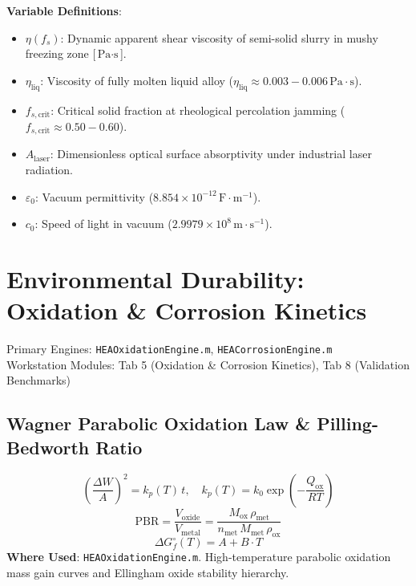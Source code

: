 \documentclass[11pt,a4paper]{article}
\begin{document}
\noindent\textbf{Variable Definitions}:
\begin{itemize}
  \item $\eta(f_s)$: Dynamic apparent shear viscosity of semi-solid slurry in mushy freezing zone [$\text{Pa}\cdot\text{s}$].
  \item $\eta_{\text{liq}}$: Viscosity of fully molten liquid alloy ($\eta_{\text{liq}} \approx 0.003 - 0.006 \, \text{Pa}\cdot\text{s}$).
  \item $f_{s, \text{crit}}$: Critical solid fraction at rheological percolation jamming ($f_{s, \text{crit}} \approx 0.50 - 0.60$).
  \item $A_{\text{laser}}$: Dimensionless optical surface absorptivity under industrial laser radiation.
  \item $\varepsilon_0$: Vacuum permittivity ($8.854 \times 10^{-12} \, \text{F}\cdot\text{m}^{-1}$).
  \item $c_0$: Speed of light in vacuum ($2.9979 \times 10^8 \, \text{m}\cdot\text{s}^{-1}$).
\end{itemize}

\section{Environmental Durability: Oxidation \& Corrosion Kinetics}
Primary Engines: \texttt{HEAOxidationEngine.m}, \texttt{HEACorrosionEngine.m} \\
Workstation Modules: Tab 5 (Oxidation & Corrosion Kinetics), Tab 8 (Validation Benchmarks)

\subsection{Wagner Parabolic Oxidation Law \& Pilling-Bedworth Ratio}
\begin{equation}
\left(\frac{\Delta W}{A}\right)^2 = k_p(T) \, t, \quad k_p(T) = k_0 \exp\left(-\frac{Q_{\text{ox}}}{R T}\right)
\end{equation}
\begin{equation}
\text{PBR} = \frac{V_{\text{oxide}}}{V_{\text{metal}}} = \frac{M_{\text{ox}} \, \rho_{\text{met}}}{n_{\text{met}} \, M_{\text{met}} \, \rho_{\text{ox}}}
\end{equation}
\begin{equation}
\Delta G_f^\circ(T) = A + B \cdot T
\end{equation}
\textbf{Where Used}: \texttt{HEAOxidationEngine.m}. High-temperature parabolic oxidation mass gain curves and Ellingham oxide stability hierarchy.
\end{document}
